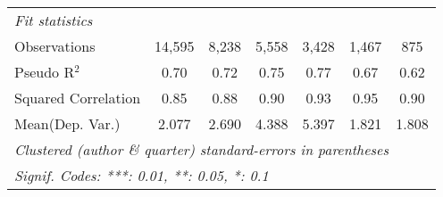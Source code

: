 \begin{tabular}{lcccccc}
   \midrule
   \emph{Fit statistics}\\
   Observations                                               & 14,595        & 8,238         & 5,558        & 3,428        & 1,467       & 875\\  
   Pseudo R$^2$                                               & 0.70          & 0.72          & 0.75         & 0.77         & 0.67        & 0.62\\  
   Squared Correlation                                        & 0.85          & 0.88          & 0.90         & 0.93         & 0.95        & 0.90\\  
Mean(Dep. Var.) & 2.077 & 2.690 & 4.388 & 5.397 & 1.821 & 1.808 \\
   \midrule \midrule
   \multicolumn{7}{l}{\emph{Clustered (author \& quarter) standard-errors in parentheses}}\\
   \multicolumn{7}{l}{\emph{Signif. Codes: ***: 0.01, **: 0.05, *: 0.1}}\\
\end{tabular}
\par\endgroup
